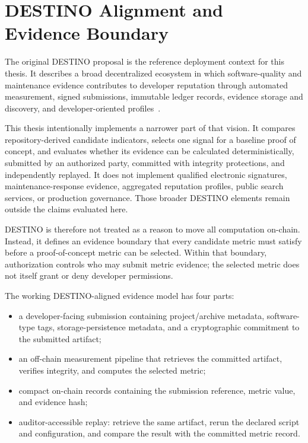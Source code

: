 \section{DESTINO Alignment and Evidence Boundary}
\label{sec:destino_context}

The original DESTINO proposal is the reference deployment context for this thesis. It describes a broad decentralized
ecosystem in which software-quality and maintenance evidence contributes to developer reputation through automated
measurement, signed submissions, immutable ledger records, evidence storage and discovery, and developer-oriented
profiles~\cite{destinoProposal}.

This thesis intentionally implements a narrower part of that vision. It compares repository-derived candidate indicators,
selects one signal for a baseline proof of concept, and evaluates whether its evidence can be calculated deterministically,
submitted by an authorized party, committed with integrity protections, and independently replayed. It does not implement
qualified electronic signatures, maintenance-response evidence, aggregated reputation profiles, public search services, or
production governance. Those broader DESTINO elements remain outside the claims evaluated here.

DESTINO is therefore not treated as a reason to move all computation on-chain. Instead, it defines an evidence boundary that
every candidate metric must satisfy before a proof-of-concept metric can be selected. Within that boundary, authorization
controls who may submit metric evidence; the selected metric does not itself grant or deny developer permissions.

The working DESTINO-aligned evidence model has four parts:
\begin{itemize}[leftmargin=*]
  \item a developer-facing submission containing project/archive metadata, software-type tags, storage-persistence metadata,
  and a cryptographic commitment to the submitted artifact;
  \item an off-chain measurement pipeline that retrieves the committed artifact, verifies integrity, and computes the selected metric;
  \item compact on-chain records containing the submission reference, metric value, and evidence hash;
  \item auditor-accessible replay: retrieve the same artifact, rerun the declared script and configuration, and compare the result
  with the committed metric record.
\end{itemize}

